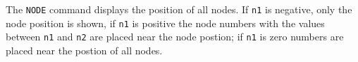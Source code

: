 \headb

The {\tt NODE} command displays the position of all nodes.  If {\tt n1}
is negative, only the node position is shown, if {\tt n1} is positive the
node numbers with the values between {\tt n1} and {\tt n2} are
placed near the node postion;
if {\tt n1} is zero numbers are placed near the postion of all nodes.
\vfill
\eject

